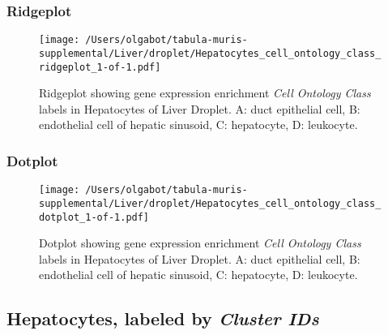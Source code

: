 \clearpage

\subsubsection{Ridgeplot}
\begin{figure}[h]
\centering
\texttt{[image: /Users/olgabot/tabula-muris-supplemental/Liver/droplet/Hepatocytes\_cell\_ontology\_class\_ridgeplot\_1-of-1.pdf]}

\caption{ Ridgeplot  showing gene expression enrichment \emph{Cell Ontology Class} labels in Hepatocytes of Liver Droplet. A: duct epithelial cell, B: endothelial cell of hepatic sinusoid, C: hepatocyte, D: leukocyte.}
\end{figure}


\clearpage

\subsubsection{Dotplot}
\begin{figure}[h]
\centering
\texttt{[image: /Users/olgabot/tabula-muris-supplemental/Liver/droplet/Hepatocytes\_cell\_ontology\_class\_dotplot\_1-of-1.pdf]}

\caption{ Dotplot  showing gene expression enrichment \emph{Cell Ontology Class} labels in Hepatocytes of Liver Droplet. A: duct epithelial cell, B: endothelial cell of hepatic sinusoid, C: hepatocyte, D: leukocyte.}
\end{figure}


\clearpage

\subsection{Hepatocytes, labeled by \emph{Cluster IDs}}
